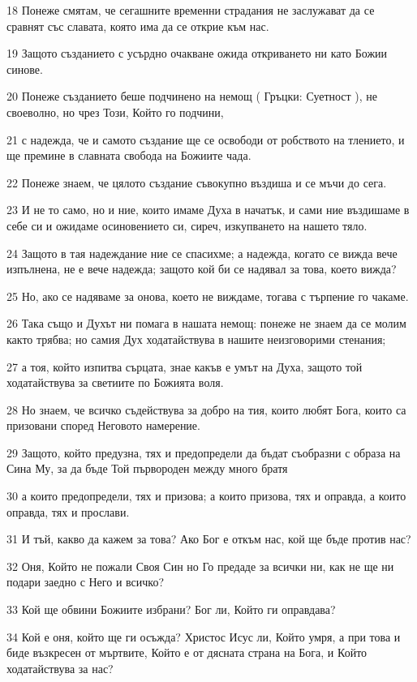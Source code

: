 \par 18 Понеже смятам, че сегашните временни страдания не заслужават да се сравнят със славата, която има да се открие към нас.
\par 19 Защото създанието с усърдно очакване ожида откриването ни като Божии синове.
\par 20 Понеже създанието беше подчинено на немощ ( Гръцки: Суетност ), не своеволно, но чрез Този, Който го подчини,
\par 21 с надежда, че и самото създание ще се освободи от робството на тлението, и ще премине в славната свобода на Божиите чада.
\par 22 Понеже знаем, че цялото създание съвокупно въздиша и се мъчи до сега.
\par 23 И не то само, но и ние, които имаме Духа в начатък, и сами ние въздишаме в себе си и ожидаме осиновението си, сиреч, изкупването на нашето тяло.
\par 24 Защото в тая надеждание ние се спасихме; а надежда, когато се вижда вече изпълнена, не е вече надежда; защото кой би се надявал за това, което вижда?
\par 25 Но, ако се надяваме за онова, което не виждаме, тогава с търпение го чакаме.
\par 26 Така също и Духът ни помага в нашата немощ: понеже не знаем да се молим както трябва; но самия Дух ходатайствува в нашите неизговорими стенания;
\par 27 а тоя, който изпитва сърцата, знае какъв е умът на Духа, защото той ходатайствува за светиите по Божията воля.
\par 28 Но знаем, че всичко съдействува за добро на тия, които любят Бога, които са призовани според Неговото намерение.
\par 29 Защото, който предузна, тях и предопредели да бъдат съобразни с образа на Сина Му, за да бъде Той първороден между много братя
\par 30 а които предопредели, тях и призова; а които призова, тях и оправда, а които оправда, тях и прослави.
\par 31 И тъй, какво да кажем за това? Ако Бог е откъм нас, кой ще бъде против нас?
\par 32 Оня, Който не пожали Своя Син но Го предаде за всички ни, как не ще ни подари заедно с Него и всичко?
\par 33 Кой ще обвини Божиите избрани? Бог ли, Който ги оправдава?
\par 34 Кой е оня, който ще ги осъжда? Христос Исус ли, Който умря, а при това и биде възкресен от мъртвите, Който е от дясната страна на Бога, и Който ходатайствува за нас?
